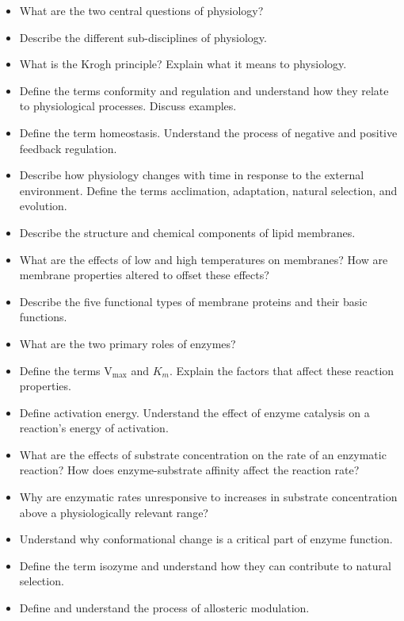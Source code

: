 \documentclass[12pt,a4paper]{article}
\begin{document}
\begin{itemize}
    \item What are the two central questions of physiology? 
    \item Describe the different sub-disciplines of physiology.
    \item What is the Krogh principle? Explain what it means to physiology.
    \item Define the terms conformity and regulation and understand how they relate to physiological processes. Discuss examples.
    \item Define the term homeostasis. Understand the process of negative and positive feedback regulation.
    \item Describe how physiology changes with time in response to the external environment. Define the terms acclimation, adaptation, natural selection, and evolution.
    \item Describe the structure and chemical components of lipid membranes.
    \item What are the effects of low and high temperatures on membranes? How are membrane properties altered to offset these effects?
    \item Describe the five functional types of membrane proteins and their basic functions.
    \item What are the two primary roles of enzymes?
    \item Define the terms V\(_{\text{max}}\) and \(K_m\). Explain the factors that affect these reaction properties.
    \item Define activation energy. Understand the effect of enzyme catalysis on a reaction’s energy of activation.
    \item What are the effects of substrate concentration on the rate of an enzymatic reaction? How does enzyme-substrate affinity affect the reaction rate?
    \item Why are enzymatic rates unresponsive to increases in substrate concentration above a physiologically relevant range?
    \item Understand why conformational change is a critical part of enzyme function.
    \item Define the term isozyme and understand how they can contribute to natural selection.
    \item Define and understand the process of allosteric modulation.
\end{itemize}
\end{document}
